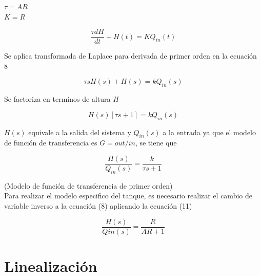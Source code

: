 \documentclass[a4paper,12pt,twoside]{proyectotanquesecci}
\begin{document}
\begin{center}
$\tau =AR$ \\
$K=R$
\end{center}

\begin{equation}
\frac {\tau dH}{dt}+H\left( t\right) =KQ_{in}\left( t\right)
\end{equation}

Se aplica transformada de Laplace para derivada de primer orden en la ecuación 8

\begin{equation}
\tau sH\left( s\right) +H\left( s\right) =kQ_{in}\left( s\right)
\end{equation}

Se factoriza en terminos de altura \textit{H}

\begin{equation}
H\left( s\right) \left[ \tau s+1\right] =kQ_{in}\left( s\right)
\end{equation}

$H(s)$ equivale a la salida del sistema y $Q_{in}(s)$ a la entrada ya que el modelo de función de transferencia es $G=out/in$, se tiene que

\begin{equation}
\frac {H\left( s\right) }{Q_{in}\left( s\right) }=\frac {k}{\tau s+1}
\end{equation}

(Modelo de función de transferencia de primer orden) \\

Para realizar el modelo especifico del tanque, es necesario realizar el cambio de variable inverso a la ecuación (8) aplicando la ecuación (11)

\begin{equation}
\frac {H\left( s\right) }{Qin\left( s\right) }=\frac {R}{AR+1}
\end{equation}




\newpage




\section{Linealización}
\end{document}

